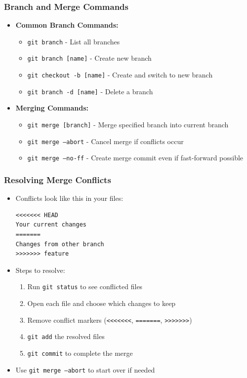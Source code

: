 \documentclass[10pt]{beamer}
\begin{document}
\begin{frame}
    \frametitle{Branch and Merge Commands}
    \begin{itemize}
        \item \textbf{Common Branch Commands:}
        \begin{itemize}
            \item \texttt{git branch} - List all branches
            \item \texttt{git branch [name]} - Create new branch
            \item \texttt{git checkout -b [name]} - Create and switch to new branch
            \item \texttt{git branch -d [name]} - Delete a branch
        \end{itemize}
        \vspace{0.3em}
        \item \textbf{Merging Commands:}
        \begin{itemize}
            \item \texttt{git merge [branch]} - Merge specified branch into current branch
            \item \texttt{git merge --abort} - Cancel merge if conflicts occur
            \item \texttt{git merge --no-ff} - Create merge commit even if fast-forward possible
        \end{itemize}
    \end{itemize}
\end{frame}

\begin{frame}[fragile]
    \frametitle{Resolving Merge Conflicts}
    \begin{itemize}
        \item Conflicts look like this in your files:
        \begin{verbatim}
<<<<<<< HEAD
Your current changes
=======
Changes from other branch
>>>>>>> feature
        \end{verbatim}
        \item Steps to resolve:
        \begin{enumerate}
            \item Run \texttt{git status} to see conflicted files
            \item Open each file and choose which changes to keep
            \item Remove conflict markers (\texttt{<<<<<<<}, \texttt{=======}, \texttt{>>>>>>>})
            \item \texttt{git add} the resolved files
            \item \texttt{git commit} to complete the merge
        \end{enumerate}
        \item Use \texttt{git merge --abort} to start over if needed
    \end{itemize}
\end{frame}
\end{document}
